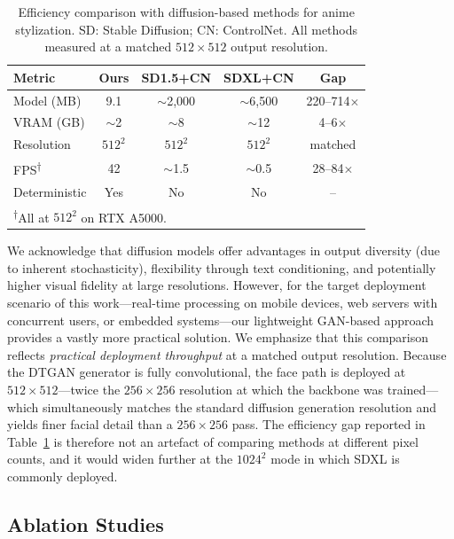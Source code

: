 \documentclass[journal]{IEEEtran}
\begin{document}
\begin{table}[t]
\caption{Efficiency comparison with diffusion-based methods for anime stylization. SD: Stable Diffusion; CN: ControlNet. All methods measured at a matched $512 \times 512$ output resolution.}
\label{tab:diffusion}
\centering
\footnotesize
\setlength{\tabcolsep}{3.5pt}
\begin{tabular}{lcccc}
\toprule
\textbf{Metric} & \textbf{Ours} & \textbf{SD1.5+CN} & \textbf{SDXL+CN} & \textbf{Gap} \\
\midrule
Model (MB) & 9.1 & $\sim$2,000 & $\sim$6,500 & 220--714$\times$ \\
VRAM (GB) & $\sim$2 & $\sim$8 & $\sim$12 & 4--6$\times$ \\
Resolution & $512^2$ & $512^2$ & $512^2$ & matched \\
FPS\textsuperscript{$\dagger$} & 42 & $\sim$1.5 & $\sim$0.5 & 28--84$\times$ \\
Deterministic & Yes & No & No & -- \\
\bottomrule
\multicolumn{5}{l}{\textsuperscript{$\dagger$}All at $512^2$ on RTX A5000.}
\end{tabular}
\end{table}

We acknowledge that diffusion models offer advantages in output diversity (due to inherent stochasticity), flexibility through text conditioning, and potentially higher visual fidelity at large resolutions. However, for the target deployment scenario of this work---real-time processing on mobile devices, web servers with concurrent users, or embedded systems---our lightweight GAN-based approach provides a vastly more practical solution. We emphasize that this comparison reflects \textit{practical deployment throughput} at a matched output resolution. Because the DTGAN generator is fully convolutional, the face path is deployed at $512 \times 512$---twice the $256 \times 256$ resolution at which the backbone was trained---which simultaneously matches the standard diffusion generation resolution and yields finer facial detail than a $256 \times 256$ pass. The efficiency gap reported in Table~\ref{tab:diffusion} is therefore not an artefact of comparing methods at different pixel counts, and it would widen further at the $1024^2$ mode in which SDXL is commonly deployed.

\subsection{Ablation Studies}
\label{subsec:ablation}
\end{document}
